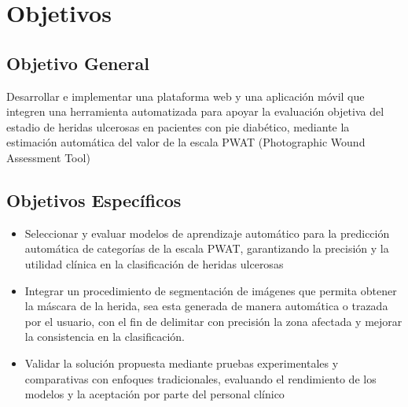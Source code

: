 \section{Objetivos}

\subsection{Objetivo General}
\label{sc:OG}
Desarrollar e implementar una plataforma web y una aplicación móvil que integren una herramienta automatizada para apoyar la evaluación objetiva del estadio de heridas ulcerosas en pacientes con pie diabético, mediante la estimación automática del valor de la escala PWAT (Photographic Wound Assessment Tool) 

\subsection{Objetivos Específicos}
\label{ssc:OE}

\begin{itemize}
    \item Seleccionar y evaluar modelos de aprendizaje automático para la predicción automática de categorías de la escala PWAT, garantizando la precisión y la utilidad clínica en la clasificación de heridas ulcerosas
    \item Integrar un procedimiento de segmentación de imágenes que permita obtener la máscara de la herida, sea esta generada de manera automática o trazada por el usuario, con el fin de delimitar con precisión la zona afectada y mejorar la consistencia en la clasificación.
    \item Validar la solución propuesta mediante pruebas experimentales y comparativas con enfoques tradicionales, evaluando el rendimiento de los modelos y la aceptación por parte del personal clínico
\end{itemize}

